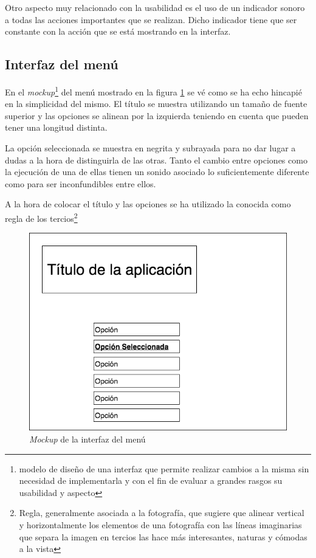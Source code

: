 \bigskip

Otro aspecto muy relacionado con la usabilidad es el uso de un indicador sonoro a todas las acciones importantes que se realizan. Dicho indicador tiene que ser constante con la acción que se está mostrando en la interfaz.

\subsection{Interfaz del menú}

En el \textit{mockup}\footnote{modelo de diseño de una interfaz que permite realizar cambios a la misma sin necesidad de implementarla y con el fin de evaluar a grandes rasgos su usabilidad y aspecto} del menú mostrado en la figura \ref{inter:menu} se vé como se ha echo hincapié en la simplicidad del mismo. El título se muestra utilizando un tamaño de fuente superior y las opciones se alinean por la izquierda teniendo en cuenta que pueden tener una longitud distinta.

\bigskip

La opción seleccionada se muestra en negrita y subrayada para no dar lugar a dudas a la hora de distinguirla de las otras. Tanto el cambio entre opciones como la ejecución de una de ellas tienen un sonido asociado lo suficientemente diferente como para ser inconfundibles entre ellos.

\bigskip A la hora de colocar el título y las opciones se ha utilizado la conocida como regla de los tercios\footnote{Regla, generalmente asociada a la fotografía, que sugiere que alinear vertical y horizontalmente los elementos de una fotografía con las líneas imaginarias que separa la imagen en tercios las hace más interesantes, naturas y cómodas a la vista}

\begin{figure}
	\centerline{\includegraphics[width=12cm]{otros/graphicalInterface/menu.png}}
	\caption{\textit{Mockup} de la interfaz del menú}
	\label{inter:menu}
\end{figure}

